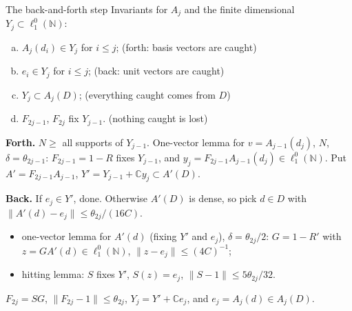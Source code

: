 \documentclass[10pt,aspectratio=169]{beamer}
\newcommand{\lo}[1]{\ell_1^0(#1)}
\newcommand{\NN}{\mathbb N}
\newcommand{\CC}{\mathbb C}
\begin{document}
\begin{frame}{The back-and-forth step}
  Invariants for $A_j$ and the finite dimensional $Y_j\subset\lo\NN$:
  \begin{enumerate}[(a)]
    \item $A_j(d_i)\in Y_j$ for $i\le j$; \hfill (forth: basis vectors are caught)
    \item $e_i\in Y_j$ for $i\le j$; \hfill (back: unit vectors are caught)
    \item $Y_j\subset A_j(D)$; \hfill (everything caught comes from $D$)
    \item $F_{2j-1}$, $F_{2j}$ fix $Y_{j-1}$. \hfill (nothing caught is lost)
  \end{enumerate}
  \medskip
  \textcolor{accent}{\textbf{Forth.}} $N\ge$ all supports of $Y_{j-1}$. One-vector
  lemma for $v=A_{j-1}(d_j)$, $N$, $\delta=\theta_{2j-1}$: $F_{2j-1}=1-R$ fixes
  $Y_{j-1}$, and $y_j=F_{2j-1}A_{j-1}(d_j)\in\lo\NN$. Put $A'=F_{2j-1}A_{j-1}$,
  $Y'=Y_{j-1}+\CC y_j\subset A'(D)$.
  \medskip

  \textcolor{good}{\textbf{Back.}} If $e_j\in Y'$, done. Otherwise $A'(D)$ is dense,
  so pick $d\in D$ with $\|A'(d)-e_j\|\le\theta_{2j}/(16C)$.
  \begin{itemize}
    \item one-vector lemma for $A'(d)$ (fixing $Y'$ and $e_j$), $\delta=\theta_{2j}/2$:
      $G=1-R'$ with $z=GA'(d)\in\lo\NN$, $\|z-e_j\|\le{(4C)}^{-1}$;
    \item hitting lemma: $S$ fixes $Y'$, $S(z)=e_j$, $\|S-1\|\le5\theta_{2j}/32$.
  \end{itemize}
  $F_{2j}=SG$, $\|F_{2j}-1\|\le\theta_{2j}$, $Y_j=Y'+\CC e_j$, and
  $e_j=A_j(d)\in A_j(D)$.
\end{frame}
\end{document}
